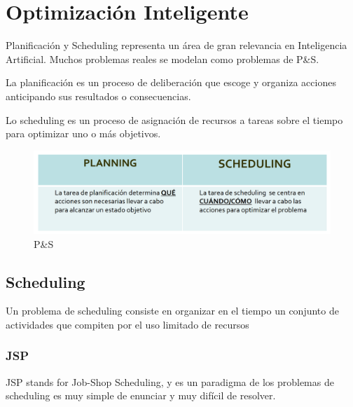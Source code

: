 \chapter{Optimización Inteligente}
Planificación y Scheduling representa un área de gran relevancia en Inteligencia Artificial. Muchos problemas reales se modelan como problemas de P\&S.

La planificación es un proceso de deliberación que escoge y
organiza acciones anticipando sus resultados o
consecuencias.

Lo scheduling es un proceso de asignación de recursos a tareas sobre el tiempo para optimizar uno o más objetivos.

\begin{figure}[htbp]
   \centering
   \includegraphics{images/04/PS.png}
   \caption{P\&S}
   \label{fig:04/PS}
\end{figure}
\section{Scheduling}
Un problema de scheduling consiste en organizar en el tiempo un
conjunto de actividades que compiten por el uso limitado de recursos


\subsection{JSP}
JSP stands for Job-Shop Scheduling, y es un paradigma de los problemas de scheduling es muy simple de
enunciar y muy difícil de resolver.

